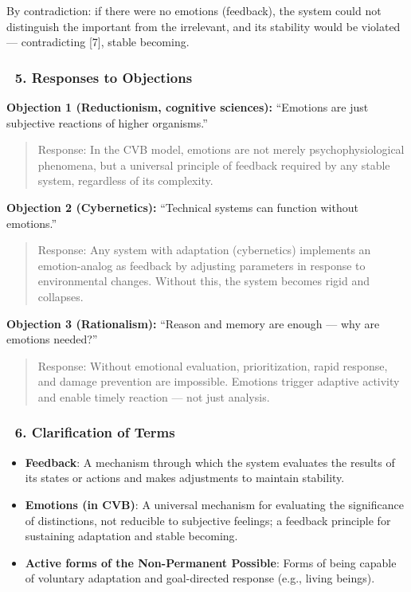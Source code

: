\documentclass[12pt]{article}
\begin{document}
By contradiction: if there were no emotions (feedback), the system could not distinguish the important from the irrelevant, and its stability would be violated — contradicting [7], stable becoming.

\subsubsection*{🔹 5. Responses to Objections}

\textbf{Objection 1 (Reductionism, cognitive sciences):} ``Emotions are just subjective reactions of higher organisms.''

\begin{quote}
Response: In the CVB model, emotions are not merely psychophysiological phenomena, but a universal principle of feedback required by any stable system, regardless of its complexity.
\end{quote}

\textbf{Objection 2 (Cybernetics):} ``Technical systems can function without emotions.''

\begin{quote}
Response: Any system with adaptation (cybernetics) implements an emotion-analog as feedback by adjusting parameters in response to environmental changes. Without this, the system becomes rigid and collapses.
\end{quote}

\textbf{Objection 3 (Rationalism):} ``Reason and memory are enough — why are emotions needed?''

\begin{quote}
Response: Without emotional evaluation, prioritization, rapid response, and damage prevention are impossible. Emotions trigger adaptive activity and enable timely reaction — not just analysis.
\end{quote}

\subsubsection*{🔹 6. Clarification of Terms}

\begin{itemize}
\item \textbf{Feedback}: A mechanism through which the system evaluates the results of its states or actions and makes adjustments to maintain stability.
\item \textbf{Emotions (in CVB)}: A universal mechanism for evaluating the significance of distinctions, not reducible to subjective feelings; a feedback principle for sustaining adaptation and stable becoming.
\item \textbf{Active forms of the Non-Permanent Possible}: Forms of being capable of voluntary adaptation and goal-directed response (e.g., living beings).
\end{itemize}
\end{document}
